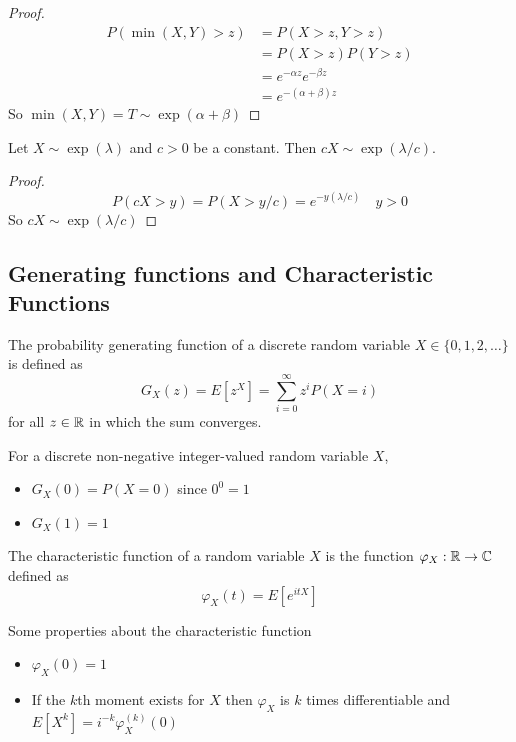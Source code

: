 \begin{proof}
\begin{align*}
    P(\min(X,Y) > z) &= P(X > z, Y > z)\\
    &= P(X > z) P(Y > z)\\
    &= e^{-\alpha z} e^{-\beta z}\\
    &= e^{-(\alpha + \beta) z}
\end{align*}
So $\min(X,Y) = T \sim \exp(\alpha + \beta)$
\end{proof}

\begin{theorem} \label{thm:exp_scaling}
Let $X \sim \exp(\lambda)$ and $c > 0$ be a constant.
Then $cX \sim \exp(\lambda/c)$.
\end{theorem}

\begin{proof}
$$
    P(cX > y) = P(X > y/c) = e^{-y (\lambda/c)} \quad y > 0
$$
So $cX \sim \exp(\lambda/c)$
\end{proof}

\subsection{Generating functions and Characteristic Functions}

\begin{defn}
The probability generating function of a discrete random variable $X \in \{0,1,2, \ldots\}$ is defined as
$$
G_X(z) = E[z^X] = \sum_{i = 0}^\infty z^i P(X = i)
$$
for all $z \in \mathbb{R}$ in which the sum converges.
\end{defn}

\begin{note}
For a discrete non-negative integer-valued random variable $X$,
\begin{itemize}
    \item $G_X(0) = P(X = 0)$ since $0^0 = 1$
    \item $G_X(1) = 1$
\end{itemize}
\end{note}

\begin{defn}
The characteristic function of a random variable $X$ is the function $\varphi_X : \mathbb{R} \to \mathbb C$ defined as
$$
\varphi_X(t) = E[e^{itX}]
$$
\end{defn}

\begin{remark}
Some properties about the characteristic function
\begin{itemize}
    \item $\varphi_X(0) = 1$
    \item If the $k$th moment exists for $X$ then $\varphi_X$ is $k$ times differentiable and $E[X^k] = i^{-k} \varphi_{X}^{(k)}(0)$
\end{itemize}
\end{remark}

